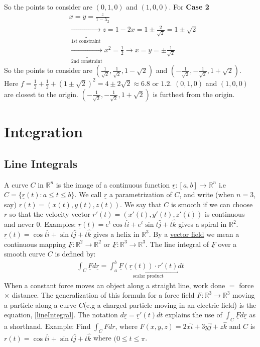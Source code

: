 \documentclass{article}
\newcommand{\nn}{\leavevmode \newline \newline} %
\newcommand{\R}{\mathbb{R}} %
\numberwithin{equation}{subsection} %
\begin{document}
So the points to consider are $(0,1,0)$ and $(1,0,0)$. For \textbf{Case 2}
\begin{equation}
    \begin{split}
        &x=y=\frac{z}{1-\lambda_2} \\
        &\underbracket{\longrightarrow}_{\text{1st constraint}}
        z=1-2x= 1\pm \frac{2}{\sqrt{2}} = 1 \pm \sqrt{2} \\
        &\underbracket{\longrightarrow}_{\text{2nd constraint}}
        x^2 = \frac{1}{2} \to x=y=\pm \frac{1}{\sqrt{2}}
    \end{split}
\end{equation}
So the points to consider are $(\frac{1}{\sqrt{2}}, \frac{1}{\sqrt{2}}, 1 - \sqrt{2})$ and $(-\frac{1}{\sqrt{2}},-\frac{1}{\sqrt{2}}, 1 + \sqrt{2})$. Here $f=\frac{1}{2}+\frac{1}{2} + (1\pm \sqrt{2})^2 = 4\pm 2 \sqrt{2} \approx 6.8 \text{ or } 1.2$. $(0,1,0)$ and $(1,0,0)$ are closest to the origin. $(-\frac{1}{\sqrt{2}},-\frac{1}{\sqrt{2}}, 1 + \sqrt{2})$ is furthest from the origin.
\section{Integration}

\subsection{Line Integrals}
A curve $C$ in $\R^n$ is the image of a continuous function $\underline{r}:[a,b]\to\R^n$ i.e $C=\{ \underline{r}(t): a \leq t \leq b \}$. We call $\underline{r}$ a parametrization of $C$, and write (when $n=3$, say) $\underline{r}(t) = (x(t),y(t),z(t))$. We say that $C$ is smooth if we can choose $\underline{r}$ so that the velocity vector $r'(t)=(x'(t),y'(t),z'(t))$ is continuous and never 0.
\nn
Examples: $\underline{r}(t)=e^t\cos{t}\hat{i}+e^t\sin{t}\hat{j} + t\hat{k}$ gives a spiral in $\R^2$. $\underline{r}(t)=\cos{t}\hat{i}+\sin{t}\hat{j} + t\hat{k}$ gives a helix in $\R^3$.
\nn
By a \underline{vector field} we mean a continuous mapping $\underline{F}:\R^2\to\R^2$ or $\underline{F}:\R^3\to\R^3$. The line integral of $\underline{F}$ over a smooth curve $C$ is defined by:
\begin{equation}
    \begin{split}
        \int_C \underline{F} d\underline{r} = \int_a^b \underbracket{\underline{F}(\underline{r}(t)) \cdot r'(t)}_{\text{scalar product}} dt
        \label{lineIntegral}
    \end{split}
\end{equation}
When a constant force moves an object along a straight line, work done $=$ force $\times$ distance. The generalization of this formula for a force field $\underline{F}:\R^3\to\R^3$ moving a particle along a curve $C$(e.g a charged particle moving in an electric field) is the equation, \eqref{lineIntegral}. The notation $d\underline{r}=\underline{r}'(t)dt$ explains the use of $\int_C \underline{F}d\underline{r}$ as a shorthand.
\nn
Example: Find $\int_C F dr$, where $F(x,y,z)=2x\hat{i}+3y\hat{j}+z\hat{k}$ and $C$ is $r(t)=\cos{t}\hat{i}+\sin{t}\hat{j}+t\hat{k}$ where $(0 \leq t \leq \pi$.
\end{document}

